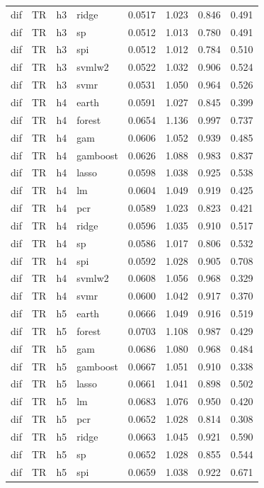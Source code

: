 \begin{ThreePartTable}
\begin{longtable}[t]{llclcccc}
dif & TR & h3 & ridge & 0.0517 & 1.023 & 0.846 & 0.491\\
dif & TR & h3 & sp & 0.0512 & 1.013 & 0.780 & 0.491\\
dif & TR & h3 & spi & 0.0512 & 1.012 & 0.784 & 0.510\\
dif & TR & h3 & svmlw2 & 0.0522 & 1.032 & 0.906 & 0.524\\
dif & TR & h3 & svmr & 0.0531 & 1.050 & 0.964 & 0.526\\
\addlinespace
dif & TR & h4 & earth & 0.0591 & 1.027 & 0.845 & 0.399\\
dif & TR & h4 & forest & 0.0654 & 1.136 & 0.997 & 0.737\\
dif & TR & h4 & gam & 0.0606 & 1.052 & 0.939 & 0.485\\
dif & TR & h4 & gamboost & 0.0626 & 1.088 & 0.983 & 0.837\\
dif & TR & h4 & lasso & 0.0598 & 1.038 & 0.925 & 0.538\\
dif & TR & h4 & lm & 0.0604 & 1.049 & 0.919 & 0.425\\
dif & TR & h4 & pcr & 0.0589 & 1.023 & 0.823 & 0.421\\
dif & TR & h4 & ridge & 0.0596 & 1.035 & 0.910 & 0.517\\
dif & TR & h4 & sp & 0.0586 & 1.017 & 0.806 & 0.532\\
dif & TR & h4 & spi & 0.0592 & 1.028 & 0.905 & 0.708\\
dif & TR & h4 & svmlw2 & 0.0608 & 1.056 & 0.968 & 0.329\\
dif & TR & h4 & svmr & 0.0600 & 1.042 & 0.917 & 0.370\\
\addlinespace
dif & TR & h5 & earth & 0.0666 & 1.049 & 0.916 & 0.519\\
dif & TR & h5 & forest & 0.0703 & 1.108 & 0.987 & 0.429\\
dif & TR & h5 & gam & 0.0686 & 1.080 & 0.968 & 0.484\\
dif & TR & h5 & gamboost & 0.0667 & 1.051 & 0.910 & 0.338\\
dif & TR & h5 & lasso & 0.0661 & 1.041 & 0.898 & 0.502\\
dif & TR & h5 & lm & 0.0683 & 1.076 & 0.950 & 0.420\\
dif & TR & h5 & pcr & 0.0652 & 1.028 & 0.814 & 0.308\\
dif & TR & h5 & ridge & 0.0663 & 1.045 & 0.921 & 0.590\\
dif & TR & h5 & sp & 0.0652 & 1.028 & 0.855 & 0.544\\
dif & TR & h5 & spi & 0.0659 & 1.038 & 0.922 & 0.671\\

\end{longtable}
\end{ThreePartTable}
